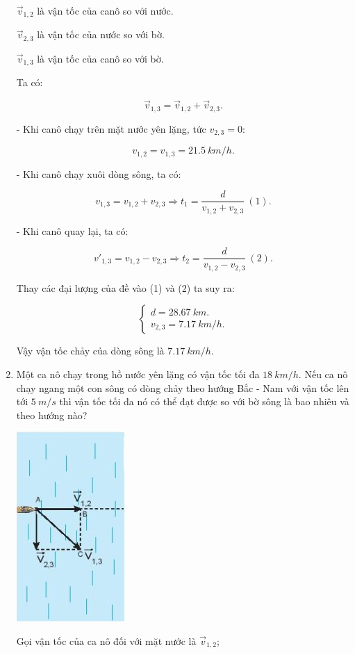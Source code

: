 \begin{enumerate}[label=\bfseries Bài \arabic*:]
{		$\vec v_{1,2}$ là vận tốc của canô so với nước.
		
		
		$\vec v_{2,3}$ là vận tốc của nước so với bờ.
		
		
		$\vec v_{1,3}$ là vận tốc của canô so với bờ.
		
		Ta có:
		
		$$\vec v_{1,3} = \vec v_{1,2} + \vec v_{2,3}.$$
		
		- Khi canô chạy trên mặt nước yên lặng, tức $v_{2,3} = 0$:
		
		
		$$v_{1,2} = v_{1,3} = \SI{21,5}{km/h}.$$
		
		- Khi canô chạy xuôi dòng sông, ta có:
		
		$$v_{1,3} = v_{1,2} + v_{2,3} \Rightarrow t_1 = \dfrac{d}{v_{1,2} + v_{2,3}}\ (1).$$
		
		- Khi canô quay lại, ta có:
		
		$$v'_{1,3} = v_{1,2} - v_{2,3} \Rightarrow t_2 = \dfrac{d}{v_{1,2} - v_{2,3}}\ (2).$$
		
		Thay các đại lượng của đề vào (1) và (2) ta suy ra:
		
		$$\begin{cases}
			d = \SI{28,67}{km}.\\
			v_{2,3} = \SI{7,17}{km/h}.
		\end{cases}$$
		
		Vậy vận tốc chảy của dòng sông là $\SI{7,17}{km/h}$.
		
		
	}
	\item {}
	
	
	{
		Một ca nô chạy trong hồ nước yên lặng có vận tốc tối đa $\SI{18}{km/h}$. Nếu ca nô chạy ngang một con sông có dòng chảy theo hướng Bắc - Nam với vận tốc lên tới $\SI{5}{m/s}$ thì vận tốc tối đa nó có thể đạt được so với bờ sông là bao nhiêu và theo hướng nào?
	}
	\hideall
	{
		\begin{center}
			\includegraphics[scale=1]{../figs/VN10-2022-PH-TP005-4.jpg}
		\end{center}
		Gọi vận tốc của ca nô đối với mặt nước là $\vec v_{1,2}$; 
		
}
\end{enumerate}

